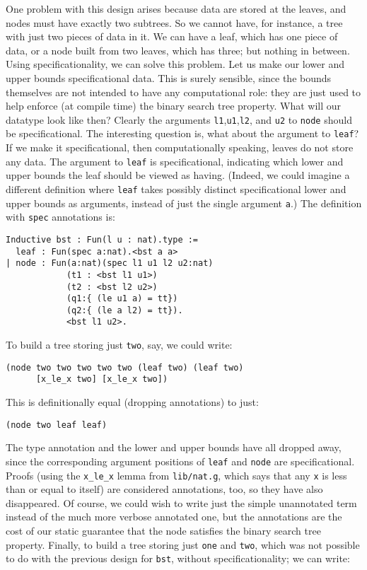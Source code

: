 \documentclass{book}[12pt]
\begin{document}
One problem with this design arises because data are stored at the
leaves, and nodes must have exactly two subtrees.  So we cannot have,
for instance, a tree with just two pieces of data in it.  We can have
a leaf, which has one piece of data, or a node built from two leaves,
which has three; but nothing in between.  Using specificationality, we
can solve this problem.  Let us make our lower and upper bounds
specificational data.  This is surely sensible, since the bounds
themselves are not intended to have any computational role: they are
just used to help enforce (at compile time) the binary search tree
property.  What will our datatype look like then?  Clearly the
arguments \texttt{l1},\texttt{u1},\texttt{l2}, and \texttt{u2} to
\texttt{node} should be specificational.  The interesting question is,
what about the argument to \texttt{leaf}?  If we make it
specificational, then computationally speaking, leaves do not store
any data.  The argument to \texttt{leaf} is specificational,
indicating which lower and upper bounds the leaf should be viewed as
having.  (Indeed, we could imagine a different definition where
\texttt{leaf} takes possibly distinct specificational lower and upper
bounds as arguments, instead of just the single argument \texttt{a}.)
The definition with \texttt{spec} annotations is:

\begin{verbatim}
Inductive bst : Fun(l u : nat).type :=
  leaf : Fun(spec a:nat).<bst a a>
| node : Fun(a:nat)(spec l1 u1 l2 u2:nat)
            (t1 : <bst l1 u1>)
            (t2 : <bst l2 u2>)
            (q1:{ (le u1 a) = tt})
            (q2:{ (le a l2) = tt}).
            <bst l1 u2>.
\end{verbatim}

\noindent To build a tree storing just \texttt{two}, say, we could
write:

\begin{verbatim}
(node two two two two two (leaf two) (leaf two) 
      [x_le_x two] [x_le_x two])
\end{verbatim}

\noindent This is definitionally equal (dropping annotations) to just:

\begin{verbatim}
(node two leaf leaf)
\end{verbatim}

\noindent The type annotation and the lower and upper bounds have all
dropped away, since the corresponding argument positions of
\texttt{leaf} and \texttt{node} are specificational.  Proofs (using
the \texttt{x\_le\_x} lemma from \texttt{lib/nat.g}, which says that
any \texttt{x} is less than or equal to itself) are considered
annotations, too, so they have also disappeared.  Of course, we could
wish to write just the simple unannotated term instead of the much
more verbose annotated one, but the annotations are the cost of our
static guarantee that the node satisfies the binary search tree
property.  Finally, to build a tree storing just \texttt{one} and
\texttt{two}, which was not possible to do with the previous design
for \texttt{bst}, without specificationality; we can write:
\end{document}
